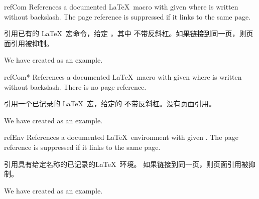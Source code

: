 % 
% 
% 
% 
% 
% 
% 
% 
% 
% 
% 
% 
% 
% 









\begin{docCommand}{refCom}{}
References a documented \LaTeX\ macro with given  where  is
written without backslash. The page reference is suppressed if it links
to the same page.

引用已有的 \LaTeX\ 宏命令，给定 ，其中  不带反斜杠。如果链接到同一页，则页面引用被抑制。
\begin{dispExample}
We have created  as an example.
\end{dispExample}
\end{docCommand}

\begin{docCommand}{refCom*}{}
References a documented \LaTeX\ macro with given  where  is
written without backslash. There is no page reference.

引用一个已记录的 \LaTeX\ 宏，给定的  不带反斜杠。没有页面引用。
\begin{dispExample}
We have created  as an example.
\end{dispExample}
\end{docCommand}


\begin{docCommand}{refEnv}{}
References a documented \LaTeX\ environment with given .
The page reference is suppressed if it links to the same page.

引用具有给定名称的已记录的\LaTeX\ 环境。 如果链接到同一页，则页面引用被抑制。
\begin{dispExample}
We have created  as an example.
\end{dispExample}
\end{docCommand}

